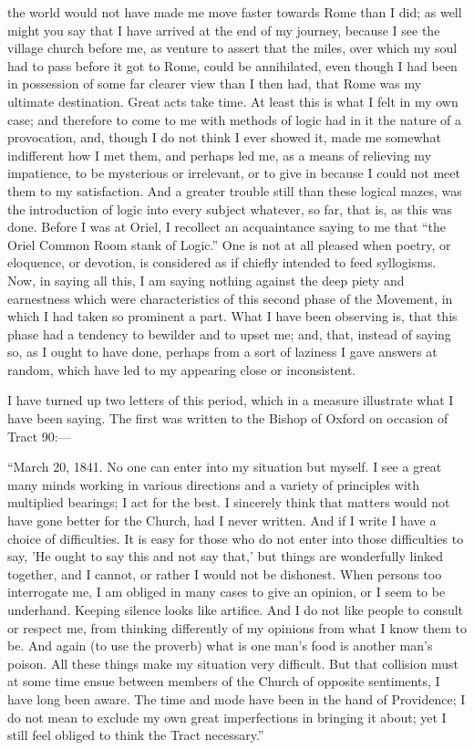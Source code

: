 the world would not have made me move faster towards Rome than I did; as
well might you say that I have arrived at the end of my journey, because
I see the village church before me, as venture to assert that the miles,
over which my soul had to pass before it got to Rome, could be
annihilated, even though I had been in possession of some far clearer view
than I then had, that Rome was my ultimate destination. Great acts take
time. At least this is what I felt in my own case; and therefore to come
to me with methods of logic had in it the nature of a provocation, and,
though I do not think I ever showed it, made me somewhat indifferent how
I met them, and perhaps led me, as a means of relieving my impatience,
to be mysterious or irrelevant, or to give in because I could not meet them to my satisfaction. And a greater trouble still than these logical mazes, was the
introduction of logic into every subject whatever, so far, that is, as
this was done. Before I was at Oriel, I recollect an acquaintance saying
to me that ``the Oriel Common Room stank of Logic.'' One is not
at all pleased when poetry, or eloquence, or devotion, is considered as
if chiefly intended to feed syllogisms. Now, in saying all this, I am
saying nothing against the deep piety and earnestness which were
characteristics of this second phase of the Movement, in which I had
taken so prominent a part. What I have been observing is, that
this phase had a tendency to bewilder and to upset me; and, that, instead
of saying so, as I ought to have done, perhaps from a sort of laziness I gave answers at random, which have led
to my appearing close or inconsistent.

I have turned up two letters of this period, which in a measure
illustrate what I have been saying. The first was written to the Bishop of Oxford on occasion of Tract 90:—

``March 20, 1841. No one can enter into my situation but myself.
I see a great many minds working in various directions and a variety of
principles with multiplied bearings; I act for the best. I sincerely
think that matters would not have gone better for the Church, had I
never written. And if I write I have a choice of difficulties. It is
easy for those who do not enter into those difficulties to say, 'He
ought to say this and not say that,' but things are wonderfully linked
together, and I cannot, or rather I would not be dishonest. When persons
too interrogate me, I am obliged in many cases to give an opinion, or I
seem to be underhand. Keeping silence looks like artifice. And I
do not like people to consult or respect me, from thinking differently
of my opinions from what I know them to be. And again (to use the
proverb) what is one man's food is another man's poison. All these
things make my situation very difficult. But that collision must at some
time ensue between members of the Church of opposite sentiments, I have
long been aware. The time and mode have been in the hand of Providence; I
do not mean to exclude my own great imperfections in bringing it about;
yet I still feel obliged to think the Tract necessary.''

